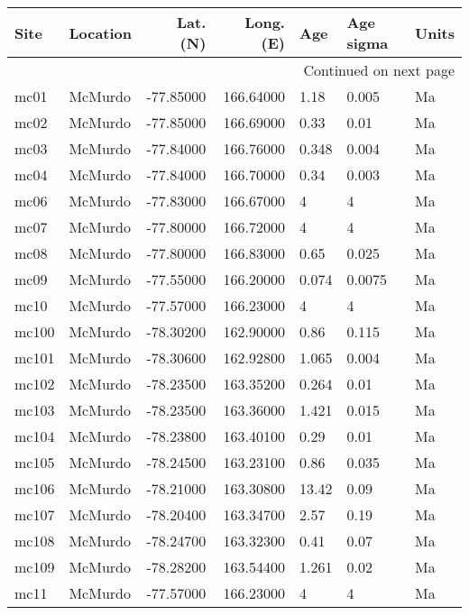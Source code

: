 \documentclass{article}
\begin{document}
\begin{longtable}{llrrlll}
\toprule
  Site & Location &  Lat. (N) &  Long. (E) &    Age  & Age sigma & Units \\
\midrule
\endhead
\midrule
\multicolumn{7}{r}{{Continued on next page}} \\
\midrule
\endfoot

\bottomrule
\endlastfoot
  mc01 &  McMurdo & -77.85000 &  166.64000 &    1.18 &     0.005 &    Ma \\
  mc02 &  McMurdo & -77.85000 &  166.69000 &    0.33 &      0.01 &    Ma \\
  mc03 &  McMurdo & -77.84000 &  166.76000 &   0.348 &     0.004 &    Ma \\
  mc04 &  McMurdo & -77.84000 &  166.70000 &    0.34 &     0.003 &    Ma \\
  mc06 &  McMurdo & -77.83000 &  166.67000 &       4 &         4 &    Ma \\
  mc07 &  McMurdo & -77.80000 &  166.72000 &       4 &         4 &    Ma \\
  mc08 &  McMurdo & -77.80000 &  166.83000 &    0.65 &     0.025 &    Ma \\
  mc09 &  McMurdo & -77.55000 &  166.20000 &   0.074 &    0.0075 &    Ma \\
  mc10 &  McMurdo & -77.57000 &  166.23000 &       4 &         4 &    Ma \\
 mc100 &  McMurdo & -78.30200 &  162.90000 &    0.86 &     0.115 &    Ma \\
 mc101 &  McMurdo & -78.30600 &  162.92800 &   1.065 &     0.004 &    Ma \\
 mc102 &  McMurdo & -78.23500 &  163.35200 &   0.264 &      0.01 &    Ma \\
 mc103 &  McMurdo & -78.23500 &  163.36000 &   1.421 &     0.015 &    Ma \\
 mc104 &  McMurdo & -78.23800 &  163.40100 &    0.29 &      0.01 &    Ma \\
 mc105 &  McMurdo & -78.24500 &  163.23100 &    0.86 &     0.035 &    Ma \\
 mc106 &  McMurdo & -78.21000 &  163.30800 &   13.42 &      0.09 &    Ma \\
 mc107 &  McMurdo & -78.20400 &  163.34700 &    2.57 &      0.19 &    Ma \\
 mc108 &  McMurdo & -78.24700 &  163.32300 &    0.41 &      0.07 &    Ma \\
 mc109 &  McMurdo & -78.28200 &  163.54400 &   1.261 &      0.02 &    Ma \\
  mc11 &  McMurdo & -77.57000 &  166.23000 &       4 &         4 &    Ma \\

\end{longtable}
\end{document}

